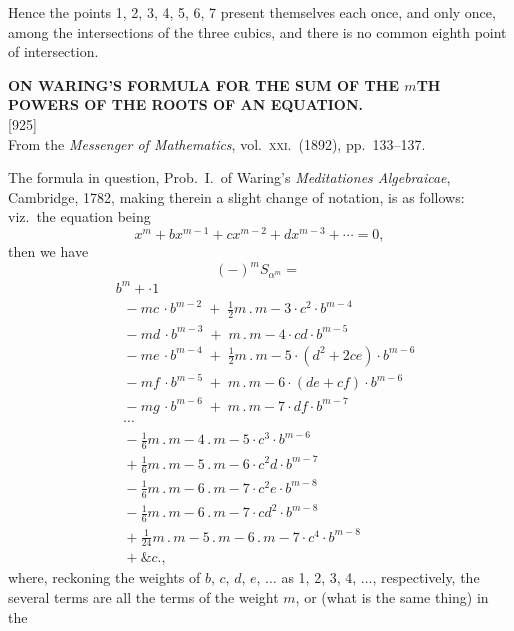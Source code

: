 \documentclass[11pt,a4paper]{article}
\newcommand{\paper}[3]{%
  \clearpage
  \begin{center}
    {\large\bfseries #2}\\[0.5em]
    {\small [#1]}\\[0.3em]
    {\small #3}
  \end{center}
  \vspace{0.5em}
}
\begin{document}
Hence the points 1, 2, 3, 4, 5, 6, 7 present themselves each once, and only once, among the intersections of the three cubics, and there is no common eighth point of intersection.

\paper{925}{ON WARING'S FORMULA FOR THE SUM OF THE $m$TH POWERS OF THE ROOTS OF AN EQUATION.}{From the \textit{Messenger of Mathematics}, vol.\ \textsc{xxi}.\ (1892), pp.\ 133--137.}

The formula in question, Prob.\ I.\ of Waring's \textit{Meditationes Algebraicae}, Cambridge, 1782, making therein a slight change of notation, is as follows: viz.\ the equation being
\[
x^m + b x^{m-1} + c x^{m-2} + d x^{m-3} + \cdots = 0,
\]
then we have
\[
(-)^m S_{\alpha^m} = \;
\]
\begin{align*}
& b^m + \cdot 1 \\
&\;\; -mc\,\cdot b^{m-2} \;+\; \tfrac{1}{2}m\,.\,m - 3\cdot c^2\cdot b^{m-4} \\
&\;\; -md\,\cdot b^{m-3} \;+\; m\,.\,m-4\cdot cd\cdot b^{m-5} \\
&\;\; -me\,\cdot b^{m-4} \;+\; \tfrac{1}{2}m\,.\,m-5\cdot(d^2 + 2ce)\cdot b^{m-6} \\
&\;\; -mf\,\cdot b^{m-5} \;+\; m\,.\,m-6\cdot(de + cf)\cdot b^{m-6} \\
&\;\; -mg\,\cdot b^{m-6} \;+\; m\,.\,m-7\cdot df\cdot b^{m-7} \\
&\;\; \cdots \\
&\;\; -\tfrac{1}{6}m\,.\,m-4\,.\,m-5\cdot c^3\cdot b^{m-6} \\
&\;\; +\tfrac{1}{6}m\,.\,m-5\,.\,m-6\cdot c^2 d\cdot b^{m-7} \\
&\;\; -\tfrac{1}{6}m\,.\,m-6\,.\,m-7\cdot c^2 e\cdot b^{m-8} \\
&\;\; -\tfrac{1}{6}m\,.\,m-6\,.\,m-7\cdot c d^2\cdot b^{m-8} \\
&\;\; +\tfrac{1}{24}m\,.\,m-5\,.\,m-6\,.\,m-7\cdot c^4\cdot b^{m-8} \\
&\;\; + \&c.,
\end{align*}
where, reckoning the weights of $b$, $c$, $d$, $e$, $\ldots$ as 1, 2, 3, 4, $\ldots$, respectively, the several terms are all the terms of the weight $m$, or (what is the same thing) in the
\end{document}
